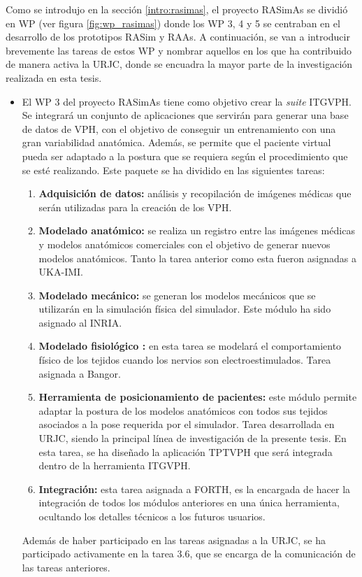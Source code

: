 Como se introdujo en la sección \ref{intro:rasimas}, el proyecto \ac{RASimAs} se dividió en \acl{WP} (ver figura \ref{fig:wp_rasimas}) donde los \ac{WP} 3, 4 y 5 se centraban en el desarrollo de los prototipos \ac{RASim} y \ac{RAAs}. 
A continuación, se van a introducir brevemente las tareas de estos \acl{WP} y nombrar aquellos en los que ha contribuido de manera activa la \ac{URJC}, donde se encuadra la mayor parte de la investigación realizada en esta tesis. 


\begin{itemize}
    \item 
El \ac{WP} 3 del proyecto \ac{RASimAs} tiene como objetivo crear la \emph{suite} \ac{ITGVPH}. Se integrará un conjunto de aplicaciones que servirán para generar una base de datos de \ac{VPH}, con el objetivo de conseguir un entrenamiento con una gran variabilidad anatómica. Además, se permite que el paciente virtual pueda ser adaptado a la postura que se requiera según el procedimiento que se esté realizando. Este paquete se ha dividido en las siguientes tareas:%
\begin{enumerate}
    \item \textbf{Adquisición de datos:} análisis y recopilación de imágenes médicas que serán utilizadas para la creación de los \ac{VPH}.
    \item \textbf{Modelado anatómico:} se realiza un registro entre las imágenes médicas y modelos anatómicos comerciales con el objetivo de generar nuevos modelos anatómicos.
    Tanto la tarea anterior como esta fueron asignadas a \ac{UKA-IMI}.
    \item \textbf{Modelado mecánico:} se generan los modelos mecánicos que se utilizarán en la simulación física del simulador. Este módulo ha sido asignado al \ac{INRIA}.
    \item \textbf{Modelado fisiológico :} en esta tarea se modelará el comportamiento físico de los tejidos cuando los nervios son electroestimulados.
    Tarea asignada a \ac{Bangor}.
    \item \textbf{Herramienta de posicionamiento de pacientes:} este módulo permite adaptar la postura de los modelos anatómicos con todos sus tejidos asociados a la pose requerida por el simulador. Tarea desarrollada en \ac{URJC}, siendo la principal línea de investigación de la presente tesis. En esta tarea, se ha diseñado la aplicación \ac{TPTVPH} que será integrada dentro de la herramienta \ac{ITGVPH}.
    \item {\textbf{Integración:}
    esta tarea asignada a \ac{FORTH}, es la encargada de hacer la integración de todos los módulos anteriores en una única herramienta, ocultando los detalles técnicos a los futuros usuarios.}
\end{enumerate}
{Además de haber participado en las tareas asignadas a la \ac{URJC}, se ha participado activamente en la tarea 3.6, que se encarga de la comunicación de las tareas anteriores.}


\end{itemize}
